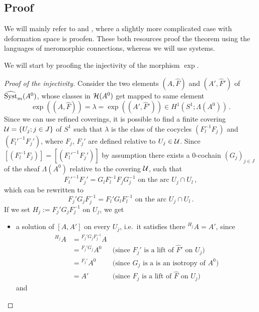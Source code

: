 \subsection{Proof}
We will mainly refer to \cite[Proof of Theorem 4.5.1]{babbitt1989local} and
\cite[Section 6.d]{sabbah2007isomonodromic}, where a slightly more complicated
case with deformation space is proofen. These both resources proof the theorem
using the languages of meromorphic connections, whereas we will use systems.

We will start by proofing the injectivity of the morphism $\exp$.
\begin{proof}[Proof of the injectivity]
  Consider the two elements $(A,\hat F)$ and $(A',\hat F')$ of
  $\widehat{\operatorname{Syst}}_m(A^0)$, whose classes in $\mathcal{H}(A^0)$ get mapped to same element
  \[
    \exp((A,\hat F))=\lambda=\exp((A',\hat F'))
      \in H^1(S^1;\Lambda(A^0)) \,.
  \]
  Since we can use refined coverings, it is possible to find a finite covering
  $\mathcal{U}=\{U_j;j\in J\}$ of $S^1$ such that $\lambda$ is the class of the
  cocycles $(F_l^{-1}F_j)$ and $(F_l'^{-1}F_j')$, where $F_j$, $F_j'$ are
  defined relative to $U_j\in\mathcal{U}$.
  Since $[(F_l^{-1}F_j)]=[(F_l'^{-1}F_j')]$ by assumption there exists a
  $0$-cochain $(G_j)_{j\in J}$ of the sheaf $\Lambda(A^0)$ relative to the
  covering $\mathcal{U}$, such that
  \[
    F_l'^{-1}F_j'=G_lF_l^{-1}F_jG_j^{-1}
    \text{~on~the~arc~} U_j\cap U_l \,,
  \]
  which can be rewritten to
  \[
    F_j'G_jF_j^{-1} = F_l'G_lF_l^{-1}
    \text{~on~the~arc~} U_j\cap U_l \,.
  \]
  If we set $H_j:=F_j'G_{j}F_j^{-1}$ on $U_{j}$, we get
  \begin{itemize}
    \item a solution of $[A,A']$ on every $U_j$, i.e.\ it
      satisfies there ${}^{H_j}A=A'$, since
      \begin{align*}
        {}^{H_j}A &= {}^{F_j'G_{j}F_j^{-1}}A
        \\&={}^{F_j'G_{j}}A^0
        & \text{(since $F_j'$ is a lift of $\hat F'$ on $U_j$)}
        \\&={}^{F_j'}A^0
        & \text{(since $G_j$ is a is an isotropy of $A^0$)}
        \\&=A'
        & \text{(since $F_j$ is a lift of $\hat F$ on $U_j$)}
      \end{align*}
      and

\end{itemize}
\end{proof}
